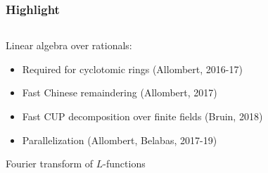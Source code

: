 \documentclass{beamer}
\begin{document}


\begin{frame}
  \frametitle{Highlight}

  \begin{columns}
    \begin{column}{.48\textwidth}
 Linear algebra over rationals:
 \begin{itemize}
  \item Required for cyclotomic rings (Allombert, 2016-17)
  \item Fast Chinese remaindering (Allombert, 2017)
  \item Fast CUP decomposition over finite fields (Bruin, 2018)
  \item Parallelization (Allombert, Belabas, 2017-19)
  \end{itemize}
    Fourier transform of $L$-functions
  
    \end{column}
    \begin{column}{.52\textwidth}
      \begin{center}

  \end{center}   
    \end{column}
  \end{columns}
\end{frame}


\end{document}
